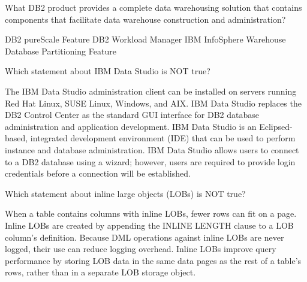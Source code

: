 \documentclass[answers, 11pt]{exam}
\begin{document}
\begin{questions}
\question[1]
What DB2 product provides a complete data warehousing solution that contains components
that facilitate data warehouse construction and administration?
\begin{choices}
\choice DB2 pureScale Feature
\choice DB2 Workload Manager
\choice IBM InfoSphere Warehouse
\choice Database Partitioning Feature
\end{choices}

\question[1]
Which statement about IBM Data Studio is NOT true?
\begin{choices}
\choice The IBM Data Studio administration client can be installed on servers running Red Hat Linux, SUSE Linux,
		Windows, and AIX.
\choice IBM Data Studio replaces the DB2 Control Center as the standard GUI interface for DB2 database administration
		and application development.
\choice IBM Data Studio is an Eclipsed-based, integrated development environment (IDE) that can be used to perform
		instance and database administration.
\choice IBM Data Studio allows users to connect to a DB2 database using a wizard; however, users are required to provide
		login credentials before a connection will be established.
\end{choices}

\question[1]
Which statement about inline large objects (LOBs) is NOT true?
\begin{choices} 
\choice When a table contains columns with inline LOBs, fewer rows can fit on a page.
\choice Inline LOBs are created by appending the INLINE LENGTH clause to a LOB column's definition.
\choice Because DML operations against inline LOBs are never logged, their use can reduce logging overhead.
\choice Inline LOBs improve query performance by storing LOB data in the same data pages as the rest of a table's rows,
		rather than in a separate LOB storage object.
\end{choices}

\newpage
\addpoints
{}


\end{questions}
\end{document}

